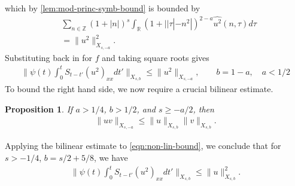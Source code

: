 \documentclass[12pt,reqno]{amsart}
\numberwithin{equation}{section}  %
\numberwithin{figure}{section}
\newcommand{\rr}{\mathbb{R}}
\newcommand{\zz}{\mathbb{Z}}
\newcommand{\wh}{\widehat}
\theoremstyle{plain}
\newtheorem{proposition}{Proposition}
\theoremstyle{definition}
\theoremstyle{remark}
\begin{document}
%
%
which by \autoref{lem:mod-princ-symb-bound} is bounded by 
%
%
%
\begin{equation*}
\begin{split}
  & 
  \sum_{n \in \zz} (1 + |n|)^{s} \int_{\rr} (1 + | |\tau|
  - n^{2} |)^{2-a} \wh{u^{2}}(n, \tau) d \tau  
  \\
  & = \|u^{2} \|_{X_{s,-a}}^{2}.
\end{split}
\end{equation*}
%
%
Substituting back in for $f$ and taking square roots gives
%
%
\begin{equation}
\begin{split}
  \|\psi(t) \int_{0}^{t} S_{t-t'} (u^{2})_{xx} dt'\|_{X_{s,b}} \le \| u^{2}
  \|_{X_{s,-a}}, \qquad b = 1-a, \quad a < 1/2
\end{split}
\label{eqn:non-lin-bound}
\end{equation}
%
%
To bound the right hand side, we now require a crucial bilinear
estimate.
%
%
%
%
%
%
%
%
\begin{proposition}
\label{prop:bilin-est}
  If $a > 1/4$, $b > 1/2$, and $s \ge -a/2$, 
  then 
  \begin{equation*}
  \begin{split}
    \| uv \|_{X_{s,-a}} \le  \| u \|_{X_{s,b}} \| v \|_{X_{s,b}}.
  \end{split}
  \end{equation*}
\end{proposition}
%
%
Applying the bilinear estimate to \eqref{eqn:non-lin-bound}, we conclude that
for $s > -1/4$, $b = s/2 + 5/8$, we have 
%
%
\begin{equation}
\begin{split}
\|\psi(t) \int_{0}^{t} S_{t-t'} (u^{2})_{xx} dt'\|_{X_{s,b}} \le 
  \| u \|^2_{X_{s,b}}. 
\end{split}
\label{eqn:nonlinear-term-bound}
\end{equation}
%
%
%
%
%
%
\end{document}

